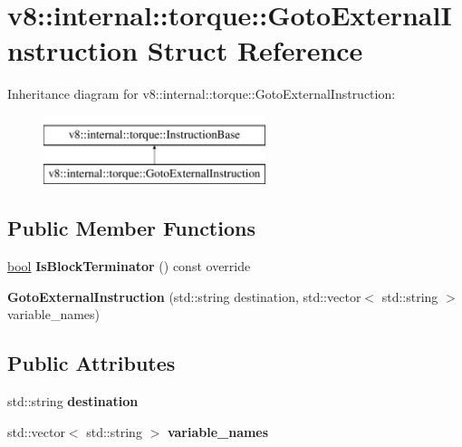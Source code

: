 \hypertarget{structv8_1_1internal_1_1torque_1_1GotoExternalInstruction}{}\section{v8\+:\+:internal\+:\+:torque\+:\+:Goto\+External\+Instruction Struct Reference}
\label{structv8_1_1internal_1_1torque_1_1GotoExternalInstruction}
Inheritance diagram for v8\+:\+:internal\+:\+:torque\+:\+:Goto\+External\+Instruction\+:\begin{figure}[H]
\begin{center}
\leavevmode
\includegraphics[height=2.000000cm]{structv8_1_1internal_1_1torque_1_1GotoExternalInstruction}
\end{center}
\end{figure}
\subsection*{Public Member Functions}
\begin{DoxyCompactItemize}
\item 
\mbox{\label{structv8_1_1internal_1_1torque_1_1GotoExternalInstruction_a24e38689114643323db399fea18fff67}} 
\mbox{\hyperlink{classbool}{bool}} {\bfseries Is\+Block\+Terminator} () const override
\item 
\mbox{\label{structv8_1_1internal_1_1torque_1_1GotoExternalInstruction_ab425d0fa83d7d62c65be0e299d24c82f}} 
{\bfseries Goto\+External\+Instruction} (std\+::string destination, std\+::vector$<$ std\+::string $>$ variable\+\_\+names)
\end{DoxyCompactItemize}
\subsection*{Public Attributes}
\begin{DoxyCompactItemize}
\item 
\mbox{\label{structv8_1_1internal_1_1torque_1_1GotoExternalInstruction_ad16a1567eb221e0045f9d4dd11325736}} 
std\+::string {\bfseries destination}
\item 
\mbox{\label{structv8_1_1internal_1_1torque_1_1GotoExternalInstruction_a135aaa66210c3a3a7c75f6d67510e77b}} 
std\+::vector$<$ std\+::string $>$ {\bfseries variable\+\_\+names}
\end{DoxyCompactItemize}



